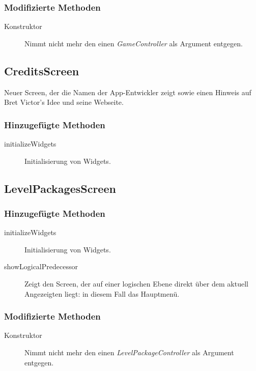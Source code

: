 \subsubsection{Modifizierte Methoden}
\begin{description}
\item[Konstruktor]
Nimmt nicht mehr den einen \emph{GameController} als Argument entgegen.

\end{description}



\subsection{CreditsScreen}
Neuer Screen, der die Namen der App-Entwickler zeigt sowie einen Hinweis auf Bret Victor's Idee und seine Webseite.

\subsubsection{Hinzugefügte Methoden}
\begin{description}
\item[initializeWidgets]
Initialisierung von Widgets.

\end{description}



\subsection{LevelPackagesScreen}

\subsubsection{Hinzugefügte Methoden}
\begin{description}
\item[initializeWidgets]
Initialisierung von Widgets.
\item[showLogicalPredecessor]
Zeigt den Screen, der auf einer logischen Ebene direkt über dem aktuell Angezeigten liegt: in diesem Fall das Hauptmenü.

\end{description}

\subsubsection{Modifizierte Methoden}
\begin{description}
\item[Konstruktor]
Nimmt nicht mehr den einen \emph{LevelPackageController} als Argument entgegen.

\end{description}



